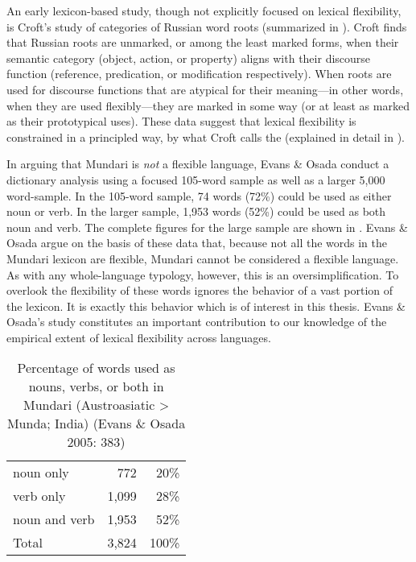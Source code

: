 An early lexicon-based study, though not explicitly focused on lexical flexibility, is Croft's  study of categories of Russian word roots (summarized in ). Croft finds that Russian roots are unmarked, or among the least marked forms, when their semantic category (object, action, or property) aligns with their discourse function (reference, predication, or modification respectively). When roots are used for discourse functions that are atypical for their meaning—in other words, when they are used flexibly—they are marked in some way (or at least as marked as their prototypical uses). These data suggest that lexical flexibility is constrained in a principled way, by what Croft calls the  (explained in detail in ).

In arguing that Mundari is \emph{not} a flexible language, Evans \& Osada  conduct a dictionary analysis using a focused 105-word sample as well as a larger 5,000 word-sample. In the 105-word sample, 74 words (72\%) could be used as either noun or verb. In the larger sample, 1,953 words (52\%) could be used as both noun and verb. The complete figures for the large sample are shown in . Evans \& Osada argue on the basis of these data that, because not all the words in the Mundari lexicon are flexible, Mundari cannot be considered a flexible language. As with any whole-language typology, however, this is an oversimplification. To overlook the flexibility of these words ignores the behavior of a vast portion of the lexicon. It is exactly this behavior which is of interest in this thesis. Evans \& Osada's study constitutes an important contribution to our knowledge of the empirical extent of lexical flexibility across languages.

\begin{table}[h]
  \centering
  \caption[Percentage of words used as nouns, verbs, or both in Mundari (Austroasiatic > Munda; India)]{Percentage of words used as nouns, verbs, or both in Mundari (Austroasiatic > Munda; India) (Evans \& Osada 2005: 383)}
  \label{tab:Evans-Osada-2005}
  \begin{tabular}{ l r r }
    \toprule
    noun only     &   772 &  20\% \\
    verb only     & 1,099 &  28\% \\
    noun and verb & 1,953 &  52\% \\
    \midrule
    Total         & 3,824 & 100\% \\
    \bottomrule
  \end{tabular}
\end{table}

